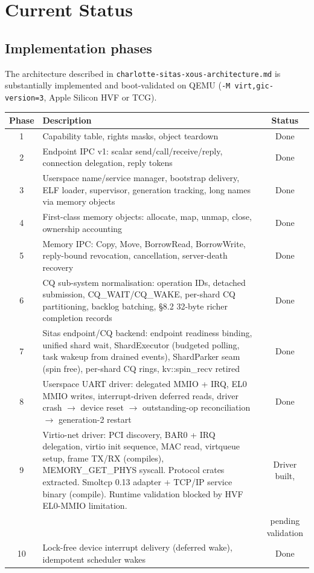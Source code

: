 \chapter{Current Status}

\section{Implementation phases}

The architecture described in \texttt{charlotte-sitas-xous-architecture.md} is
substantially implemented and boot-validated on QEMU (\texttt{-M
virt,gic-version=3}, Apple Silicon HVF or TCG).

\begin{longtable}{|c|p{9cm}|c|}
\hline
\textbf{Phase} & \textbf{Description} & \textbf{Status} \\
\hline
1 & Capability table, rights masks, object teardown & Done \\
2 & Endpoint IPC v1: scalar send/call/receive/reply, connection delegation,
    reply tokens & Done \\
3 & Userspace name/service manager, bootstrap delivery, ELF loader, supervisor,
    generation tracking, long names via memory objects & Done \\
4 & First-class memory objects: allocate, map, unmap, close, ownership
    accounting & Done \\
5 & Memory IPC: Copy, Move, BorrowRead, BorrowWrite, reply-bound revocation,
    cancellation, server-death recovery & Done \\
6 & CQ sub-system normalisation: operation IDs, detached submission,
    CQ\_WAIT/CQ\_WAKE, per-shard CQ partitioning, backlog batching, \S8.2
    32-byte richer completion records & Done \\
7 & Sitas endpoint/CQ backend: endpoint readiness binding, unified shard
    wait, ShardExecutor (budgeted polling, task wakeup from drained events),
    ShardParker seam (spin free), per-shard CQ rings, kv::spin\_recv
    retired & Done \\
8 & Userspace UART driver: delegated MMIO + IRQ, EL0 MMIO writes,
    interrupt-driven deferred reads, driver crash $\rightarrow$ device reset
    $\rightarrow$ outstanding-op reconciliation $\rightarrow$ generation-2
    restart & Done \\
9 & Virtio-net driver: PCI discovery, BAR0 + IRQ delegation, virtio init
    sequence, MAC read, virtqueue setup, frame TX/RX (compiles),
    MEMORY\_GET\_PHYS syscall. Protocol crates extracted. Smoltcp 0.13
    adapter + TCP/IP service binary (compile). Runtime validation blocked by
    HVF EL0-MMIO limitation. & Driver built, \\
    & & pending validation \\
10 & Lock-free device interrupt delivery (deferred wake), idempotent scheduler
    wakes & Done \\
\hline
\end{longtable}

